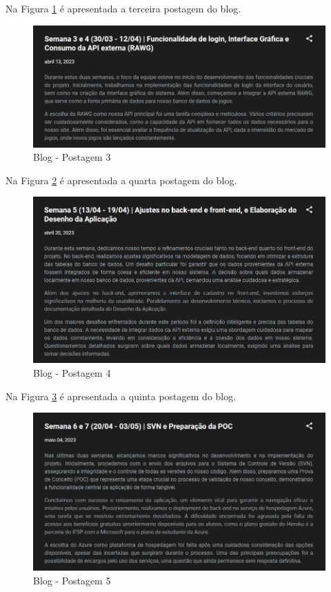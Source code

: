 \begin{apendicesenv}
Na Figura \ref{fig:111} é apresentada a terceira postagem do blog.

\begin{figure}[H]
	\centering
	\includegraphics[scale=0.68]{./imagens/Blog3.png}
	\caption{Blog - Postagem 3}
    \label{fig:111}
\end{figure}

Na Figura \ref{fig:112} é apresentada a quarta postagem do blog.

\begin{figure}[H]
	\centering
	\includegraphics[scale=0.68]{./imagens/Blog4.png}
	\caption{Blog - Postagem 4}
    \label{fig:112}
\end{figure}
\pagebreak

Na Figura \ref{fig:113} é apresentada a quinta postagem do blog.

\begin{figure}[H]
	\centering
	\includegraphics[scale=0.68]{./imagens/Blog5.png}
	\caption{Blog - Postagem 5}
    \label{fig:113}
\end{figure}


\end{apendicesenv}
